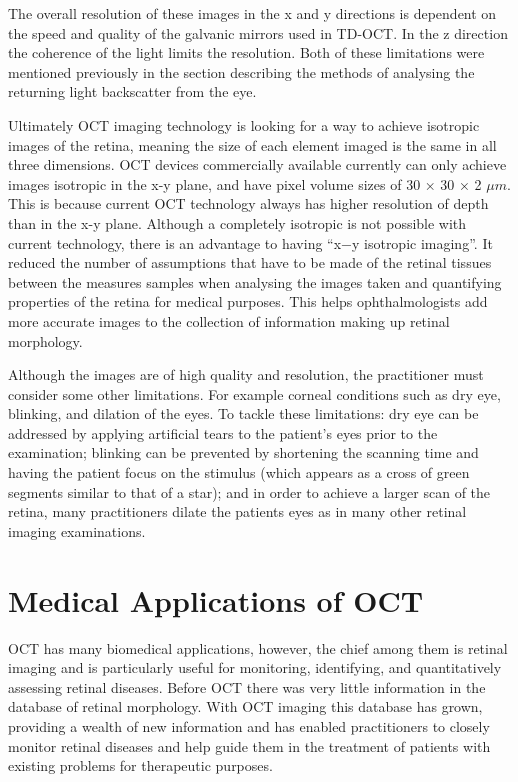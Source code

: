The overall resolution of these images in the x and y directions is dependent on the
speed and quality of the galvanic mirrors used in TD-OCT.  In the z direction the
coherence of the light limits the resolution.  Both of these limitations were mentioned
previously in the section describing the methods of analysing the returning light
backscatter from the eye.

Ultimately OCT imaging technology is looking for a way to achieve isotropic images
of the retina, meaning the size of each element imaged is the same in all three
dimensions.  OCT devices commercially available currently can only achieve images
isotropic in the x-y plane, and have pixel volume sizes
of 30 × 30 × 2 $\mu m$. \cite{mbib_4}
This is because current OCT technology always has higher resolution of depth than
in the x-y plane. \cite{mbib_4}  Although a completely isotropic is not possible
with current technology, there is an advantage to having “x−y isotropic imaging”.\cite{mbib_4} It reduced the number of assumptions that have to be
made of the retinal tissues between the measures samples when analysing the
images taken and quantifying properties of the retina for medical purposes.\cite{mbib_4} This helps ophthalmologists add more accurate images to the collection of information
making up retinal morphology.

Although the images are of high quality and resolution, the practitioner must consider
some other limitations.  For example corneal conditions such as dry eye, blinking, and
dilation of the eyes.  To tackle these limitations: dry eye can be addressed by applying
artificial tears to the patient’s eyes prior to the examination; blinking can be prevented
by shortening the scanning time and having the patient focus on the stimulus (which appears as a cross of green segments similar to that of a star); and in order to
achieve a larger scan of the retina, many practitioners dilate the patients eyes as
in many other retinal imaging examinations.\cite{mbib_4}

\section{Medical Applications of OCT}
OCT has many biomedical applications, however, the chief among them is retinal imaging and is particularly useful for monitoring, identifying, and quantitatively
assessing retinal diseases.\cite{mbib_9,mbib_4, mbib_5}  Before OCT there was
very little information in the database of retinal morphology.  With OCT imaging
this database has grown, providing a wealth of new information and has enabled
practitioners to closely  monitor retinal diseases and help guide them in the treatment
of patients with existing problems for therapeutic purposes.\cite{mbib_4}

